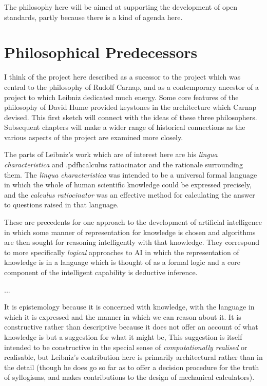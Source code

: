 The philosophy here will be aimed at supporting the development of open standards,
partly because there is a kind of agenda here.

\section{Philosophical Predecessors}

I think of the project here described as a sucessor to the project which
was central to the philosophy of Rudolf Carnap, and as a contemporary ancestor
of a project to which Leibniz dedicated much energy.
Some core features of the philosophy of David Hume provided keystones in
the architecture which Carnap devised.
This first sketch will connect with the ideas of these three philosophers.
Subsequent chapters will make a wider range of historical connections
as the various aspects of the project are examined more closely.

The parts of Leibniz's work which are of interest here are his
{\it lingua characteristica} and \empftdbook.pdfh{calculus ratiocinator} and the
rationale surrounding them.
The {\it lingua characteristica} was intended to be a universal formal language
in which the whole of human scientific knowledge could be expressed precisely,
and the {\it calculus ratiocinator} was an effective method for calculating
the answer to questions raised in that language.

These are precedents for one approach to the development of artificial intelligence
in which some manner of representation for knowledge is chosen and algorithms
are then sought for reasoning intelligently with that knowledge. 
They correspond to more specifically {\it logical} approaches to AI
in which the representation of knowledge is in a language which is thought
of as a formal logic and a core component of the intelligent capability is
deductive inference.

...

It is epistemology because it is concerned with knowledge, with the language
in which it is expressed and the manner in which we can reason about it.
It is constructive rather than descriptive because it does not offer an account
of what knowledge is but a suggestion for what it might be,
This suggestion is itself intended to be constructive in the special sense
of {\it computationally realised} or realisable, but Leibniz's contribution here is
primarily architectural rather than in the detail (though he does go so far as to
offer a decision procedure for the truth of syllogisms, and makes contributions
to the design of mechanical calculators).

